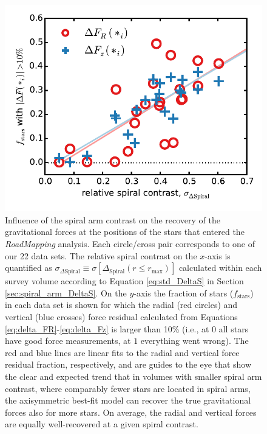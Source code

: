 \documentclass[iop,revtex4,numberedappendix,appendixfloats]{emulateapj}
\newcommand{\RM}{{\sl RoadMapping}}
\begin{document}
\begin{figure}[!htbp]
\centering
\includegraphics[width=\columnwidth]{fig/MNdHHdiffSph2_plot_stdkappa_vs_frac10star_3.pdf}
\caption{Influence of the spiral arm contrast on the recovery of the gravitational forces at the positions of the stars that entered the \RM{} analysis. Each circle/cross pair corresponds to one of our 22 data sets. The relative spiral contrast on the $x$-axis is quantified as $\sigma_{\Delta\text{Spiral}} \equiv \sigma[\Delta_\text{Spiral}(r\leq r_\text{max})]$ calculated within each survey volume according to Equation \eqref{eq:std_DeltaS} in Section \ref{sec:spiral_arm_DeltaS}. On the $y$-axis the fraction of stars ($f_\text{stars}$) in each data set is shown for which the radial (red circles) and vertical (blue crosses) force residual calculated from Equations \eqref{eq:delta_FR}-\eqref{eq:delta_Fz} is larger than 10\% (i.e., at $0$ all stars have good force measurements, at $1$ everything went wrong). The red and blue lines are linear fits to the radial and vertical force residual fraction, respectively, and are guides to the eye that show the clear and expected trend that in volumes with smaller spiral arm contrast, where comparably fewer stars are located in spiral arms, the axisymmetric best-fit model can recover the true gravitational forces also for more stars. On average, the radial and vertical forces are equally well-recovered at a given spiral contrast.}
\label{fig:std_DeltaS_vs_frac10_stars}
\end{figure}
\end{document}
